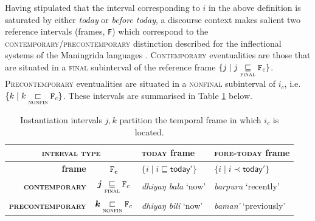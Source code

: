 %






Having stipulated that the interval corresponding to $ i $ in the above definition is saturated by either \textsl{today} or \textsl{before today}, a discourse context makes salient two reference intervals (frames, \texttt{F}) which correspond to the \textsc{contemporary\slash{}precontemporary} distinction described for the inflectional systems of the Maningrida languages \citep{Glasgow1964,Eather2011,Green1995}. \textsc{Contemporary} eventualities are those that are situated in a \textsc{final} subinterval of the reference frame $ \{j\mid j\underset{\textsc{final}}\sqsubseteq \mathtt{F}_c\} $. \textsc{Precontemporary} eventualities are situated in a \textsc{nonfinal} subinterval of $ i_c $, i.e. $ \{k\mid k\underset{\textsc{nonfin}}{\sqsubset}\mathtt{F}_c\}$. These intervals are summarised in Table \ref{InstInts} below.


\begin{table}[h]
	\caption[How to partition a temporal frame]{Instantiation intervals $ j,k $ partition the temporal frame in which $ i_c $ is located.}\centering\label{InstInts}
\begingroup	\renewcommand{\arraystretch}{1.75} 
	\begin{tabular}{rc|ll}\toprule
		\multicolumn{2}{c}{\textsc{\textbf{interval type}}} & \textsc{today} frame & \textsc{fore-today} frame\\\midrule
		\textbf{frame} &$ \boldsymbol{\mathtt{F}_c} $ & $\{i\mid i\sqsubseteq\mathsf{today'}\}$ & $\{i\mid i\prec\mathsf{today'}\} $	\\%
		{\color{forest}\textbf{\textsc{contemporary}}} &$\boldsymbol j\underset{\textsc{final}}{\sqsubseteq}\mathtt{F}_c $ & \textit{dhiyaŋ bala} `now' & \textit{barpuru} `recently'	\\
		{\color{blue}\textbf{\textsc{precontemporary}}} &$ \boldsymbol k\underset{\textsc{nonfin}}{\sqsubset}\mathtt{F}_c $	& \textit{dhiyaŋ bili} `now' & \textit{baman'} `previously'	\\\bottomrule
	\end{tabular}\endgroup
\end{table}


